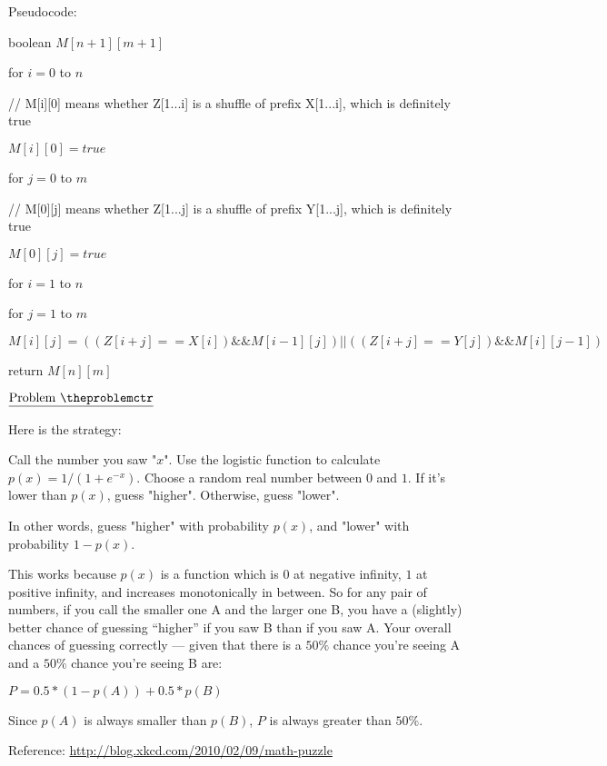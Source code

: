 \documentclass[11pt]{article}
\def\pp{\par\noindent}
\begin{document}
\bigskip
\noindent
Pseudocode:

boolean $M[n+1][m+1]$

for $i = 0$ to $n$

\hspace{.5 cm} // M[i][0] means whether Z[1...i] is a shuffle of prefix X[1...i], which is definitely true

\hspace{.5 cm} $M[i][0] = true$

for $j = 0$ to $m$

\hspace{.5 cm} // M[0][j] means whether Z[1...j] is a shuffle of prefix Y[1...j], which is definitely true

\hspace{.5 cm} $M[0][j] = true$

for $i = 1$ to $n$

\hspace{.5 cm} for $j = 1$ to $m$

\hspace{1 cm} $M[i][j] = ((Z[i+j] == X[i]) \&\& M[i - 1][j]) || ((Z[i+j] == Y[j]) \&\& M[i][j - 1])$

return $M[n][m]$




\vfill
\newpage
\addtocounter{problemctr}{1}
\bigskip
\noindent
$\underline{\rm Problem\ \theproblemctr}$\pp
\noindent
Here is the strategy:

Call the number you saw "$x$". Use the logistic function to calculate $p(x)=1/(1+e^{-x})$. Choose a random real number between $0$ and $1$. If it's lower than $p(x)$, guess "higher". Otherwise, guess "lower".

In other words, guess "higher" with probability $p(x)$, and "lower" with probability $1-p(x)$.

This works because $p(x)$ is a function which is $0$ at negative infinity, $1$ at positive infinity, and increases monotonically in between. So for any pair of numbers, if you call the smaller one A and the larger one B, you have a (slightly) better chance of guessing “higher” if you saw B than if you saw A. Your overall chances of guessing correctly — given that there is a $50\%$ chance you’re seeing A and a $50\%$ chance you’re seeing B are:

$P = 0.5 * (1-p(A)) + 0.5 * p(B)$

Since $p(A)$ is always smaller than $p(B)$, $P$ is always greater than $50\%$. 

\bigskip
Reference: \url{http://blog.xkcd.com/2010/02/09/math-puzzle}
\end{document}
